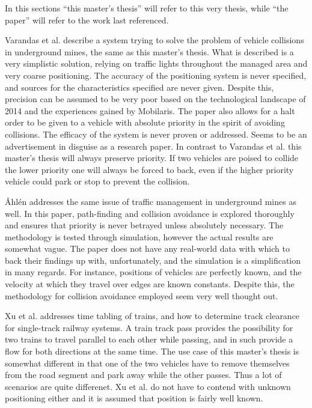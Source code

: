 \documentclass{article}
\begin{document}
			In this sections ``this master's thesis'' will refer to this very thesis, while ``the paper'' will refer to the work last referenced.

			Varandas et al. \cite{BadPaper} describe a system trying to solve the problem of vehicle collisions in underground mines, the same as this master's thesis. What is described is a very simplistic solution, relying on traffic lights throughout the managed area and very coarse positioning. The accuracy of the positioning system is never specified, and sources for the characteristics specified are never given. Despite this, precision can be assumed to be very poor based on the technological landscape of 2014 and the experiences gained by Mobilaris. The paper also allows for a halt order to be given to a vehicle with absolute priority in the spirit of avoiding collisions. The efficacy of the system is never proven or addressed. Seems to be an advertisement in disguise as a research paper. In contrast to Varandas et al. this master's thesis will always preserve priority. If two vehicles are poised to collide the lower priority one will always be forced to back, even if the higher priority vehicle could park or stop to prevent the collision.

			Åhlén \cite{UppsalaPaper} addresses the same issue of traffic management in underground mines as well. In this paper, path-finding and collision avoidance is explored thoroughly and ensures that priority is never betrayed unless absolutely necessary. The methodology is tested through simulation, however the actual results are somewhat vague. The paper does not have any real-world data with which to back their findings up with, unfortunately, and the simulation is a simplification in many regards. For instance, positions of vehicles are perfectly known, and the velocity at which they travel over edges are known constants. Despite this, the methodology for collision avoidance employed seem very well thought out.

			Xu et al. \cite{TrainPaper} addresses time tabling of trains, and how to determine track clearance for single-track railway systems. A train track pass provides the possibility for two trains to travel parallel to each other while passing, and in such provide a flow for both directions at the same time. The use case of this master's thesis is somewhat different in that one of the two vehicles have to remove themselves from the road segment and park away while the other passes. Thus a lot of scenarios are quite differenet. Xu et al. do not have to contend with unknown positioning either and it is assumed that position is fairly well known.
\end{document}
